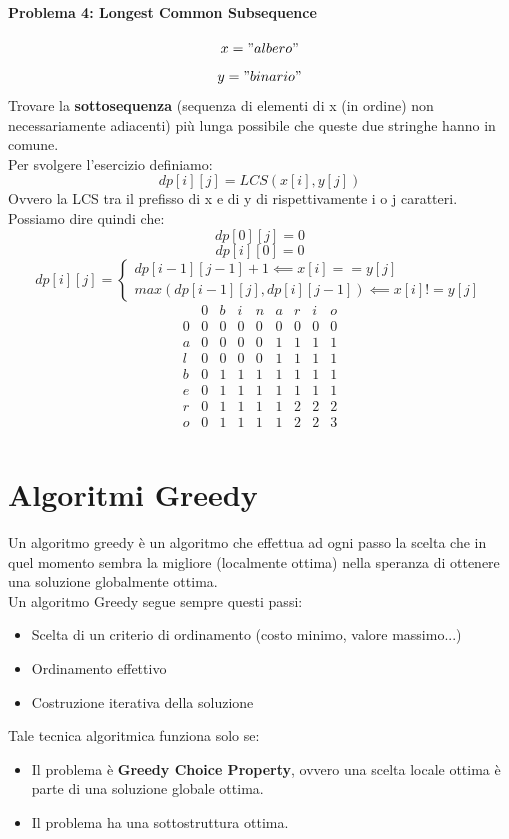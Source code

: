\documentclass[a4paper,12pt]{article}
\let\oldsection\section
\renewcommand{\section}{\clearpage\oldsection}
\begin{document}
\paragraph{Problema 4: Longest Common Subsequence}
\[
x = "albero"
\]
\[
y = "binario"
\]
Trovare la \textbf{sottosequenza} (sequenza di elementi di x (in ordine) non necessariamente adiacenti) più lunga possibile che queste due stringhe hanno in comune.\\
Per svolgere l'esercizio definiamo:
\[
dp[i][j] = LCS(x[i], y[j])
\]
Ovvero la LCS tra il prefisso di x e di y di rispettivamente i o j caratteri.\\
Possiamo dire quindi che:
\[
dp[0][j] = 0
\]
\[
dp[i][0] = 0
\]
\[
dp[i][j] = \begin{cases}
    dp[i-1][j-1] + 1 \impliedby x[i] == y[j]\\
    max(dp[i-1][j],dp[i][j-1]) \impliedby x[i] != y[j]
\end{cases}
\]
\[
\begin{array}{c|cccccccc}
   & 0 & b & i & n & a & r & i & o \\
\hline
 0 & 0 & 0 & 0 & 0 & 0 & 0 & 0 & 0 \\
 a & 0 & 0 & 0 & 0 & 1 & 1 & 1 & 1 \\
 l & 0 & 0 & 0 & 0 & 1 & 1 & 1 & 1 \\
 b & 0 & 1 & 1 & 1 & 1 & 1 & 1 & 1 \\
 e & 0 & 1 & 1 & 1 & 1 & 1 & 1 & 1 \\
 r & 0 & 1 & 1 & 1 & 1 & 2 & 2 & 2 \\
 o & 0 & 1 & 1 & 1 & 1 & 2 & 2 & 3 \\
\end{array}
\]

\section{Algoritmi Greedy}
Un algoritmo greedy è un algoritmo che effettua ad ogni passo la scelta
che in quel momento sembra la migliore (localmente ottima) nella
speranza di ottenere una soluzione globalmente ottima. \\
Un algoritmo Greedy segue sempre questi passi:
\begin{itemize}
    \item Scelta di un criterio di ordinamento (costo minimo, valore massimo...)
    \item Ordinamento effettivo
    \item Costruzione iterativa della soluzione
\end{itemize}
Tale tecnica algoritmica funziona solo se:
\begin{itemize}
    \item Il problema è \textbf{Greedy Choice Property}, ovvero una scelta locale ottima è parte di una soluzione globale ottima.
    \item Il problema ha una sottostruttura ottima.
\end{itemize}
\end{document}
